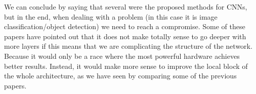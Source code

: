 We can conclude by saying that several were the proposed methods for CNNs, but in the end, when dealing with a problem (in this case it is image classification/object detection) we need to reach a compromise. Some of these papers have pointed out that it does not make totally sense to go deeper with more layers if this means that we are complicating the structure of the network. Because it would only be a race where the most powerful hardware achieves better results. Instead, it would make more sense to improve the local block of the whole architecture, as we have seen by comparing some of the previous papers.